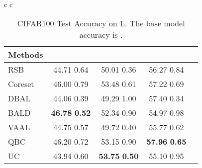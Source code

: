 \documentclass[10pt,twocolumn,letterpaper]{article}
\begin{document}
\begin{table}[ht]
\begin{center}
\begin{tabular}{c c}
\begin{minipage}{0.5\linewidth}
{        \begin{tabular}{l|cccc}
        \toprule
        Methods &  &  &  \\
        \midrule
        RSB & 44.71  0.64 & 50.01  0.36 & 56.27  0.84\\
        
        Coreset & 46.00  0.79 & 53.48  0.61 & 57.22  0.69\\
        DBAL & 44.06  0.39 & 49.29  1.00 & 57.40  0.34 \\
        BALD & \textbf{46.78}  \textbf{0.52} & 52.34  0.90 & 54.97  0.98\\
        VAAL & 44.75  0.57 & 49.72  0.40 & 55.77  0.62\\
        QBC & 46.20  0.72 & 53.15  0.90 & \textbf{57.96}  \textbf{0.65}\\
        UC & 43.94  0.60 & \textbf{53.75}  \textbf{0.50} & 55.10  0.95 \\
        
        \bottomrule
        \end{tabular}}
        
        \caption{CIFAR100 Test Accuracy on L. The base model accuracy is .}
        \label{tab:CIFAR10_exp_budget_10k_4}
        
    \end{minipage} 
    
        
        \end{tabular}
        
\end{center}
\end{table}
\end{document}

